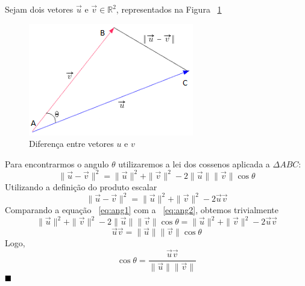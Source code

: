 \documentclass[a4paper,12pt]{article}
\begin{document}
\begin{itemize}
	Sejam dois vetores $\overrightarrow{u}$ e $\overrightarrow{v} \in \mathbb{R}^2$, representados na Figura ~\ref{fig:diffbtvet}
	\begin{figure}[H]
		\begin{center}
			\includegraphics[width=0.4\linewidth]{figures/Angulovetoresnovo.png}
		\end{center}
		\caption{Diferença entre vetores $u$ e $v$}
		\label{fig:diffbtvet}
	\end{figure}
	Para encontrarmos o angulo $\theta$ utilizaremos a lei dos cossenos aplicada a $\Delta ABC$:
	\begin{equation}
	\|\overrightarrow{u}-\overrightarrow{v}\|^{2}=\|\overrightarrow{u}\|^{2} + \|\overrightarrow{v}\|^{2} - 2\|\overrightarrow{u}\|\|\overrightarrow{v}\|\cos\theta
	\label{eq:ang1}
	\end{equation}
	Utilizando a definição do produto escalar \cite{GASteinbruch}
	\begin{equation}
	\|\overrightarrow{u}-\overrightarrow{v}\|^{2}=\|\overrightarrow{u}\|^{2} + \|\overrightarrow{v}\|^{2} - 2\overrightarrow{u}\overrightarrow{v}
	\label{eq:ang2}
	\end{equation}
	Comparando a equação ~\ref{eq:ang1} com a ~\ref{eq:ang2}, obtemos trivialmente
	$$
	\|\overrightarrow{u}\|^{2} + \|\overrightarrow{v}\|^{2} - 2\|\overrightarrow{u}\|\|\overrightarrow{v}\|\cos\theta = \|\overrightarrow{u}\|^{2} + \|\overrightarrow{v}\|^{2} - 2\overrightarrow{u}\overrightarrow{v}
	$$
	$$
	\overrightarrow{u}\overrightarrow{v} = \|\overrightarrow{u}\|\|\overrightarrow{v}\|\cos\theta
	$$
	Logo,
	$$
	\cos\theta = \frac{\overrightarrow{u}\overrightarrow{v}}{\|\overrightarrow{u}\|\|\overrightarrow{v}\|} 
	$$
	$\hfill\blacksquare$
\end{itemize}
\end{document}
